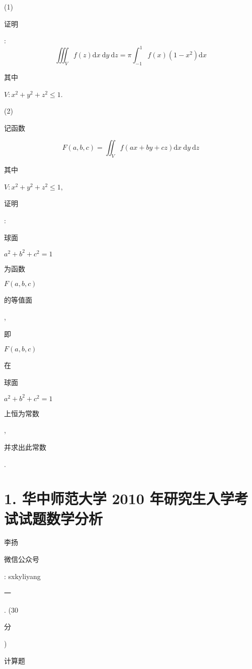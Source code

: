 \documentclass[10pt]{article}
\begin{document}
(1) \begin{CJK}{UTF8}{mj}证明\end{CJK}:
$$
\iiint_{V} f(z) \mathrm{d} x \mathrm{~d} y \mathrm{~d} z=\pi \int_{-1}^{1} f(x)\left(1-x^{2}\right) \mathrm{d} x
$$
\begin{CJK}{UTF8}{mj}其中\end{CJK} $V: x^{2}+y^{2}+z^{2} \leqslant 1$.

(2) \begin{CJK}{UTF8}{mj}记函数\end{CJK}
$$
F(a, b, c)=\iint_{V} f(a x+b y+c z) \mathrm{d} x \mathrm{~d} y \mathrm{~d} z
$$
\begin{CJK}{UTF8}{mj}其中\end{CJK} $V: x^{2}+y^{2}+z^{2} \leqslant 1$, \begin{CJK}{UTF8}{mj}证明\end{CJK}: \begin{CJK}{UTF8}{mj}球面\end{CJK} $a^{2}+b^{2}+c^{2}=1$ \begin{CJK}{UTF8}{mj}为函数\end{CJK} $F(a, b, c)$ \begin{CJK}{UTF8}{mj}的等值面\end{CJK}, \begin{CJK}{UTF8}{mj}即\end{CJK} $F(a, b, c)$ \begin{CJK}{UTF8}{mj}在\end{CJK} \begin{CJK}{UTF8}{mj}球面\end{CJK} $a^{2}+b^{2}+c^{2}=1$ \begin{CJK}{UTF8}{mj}上恒为常数\end{CJK}, \begin{CJK}{UTF8}{mj}并求出此常数\end{CJK}.

\section{1. 华中师范大学 2010 年研究生入学考试试题数学分析}
\begin{CJK}{UTF8}{mj}李扬\end{CJK}

\begin{CJK}{UTF8}{mj}微信公众号\end{CJK}: sxkyliyang

\begin{CJK}{UTF8}{mj}一\end{CJK}. (30 \begin{CJK}{UTF8}{mj}分\end{CJK}) \begin{CJK}{UTF8}{mj}计算题\end{CJK}
\end{document}

